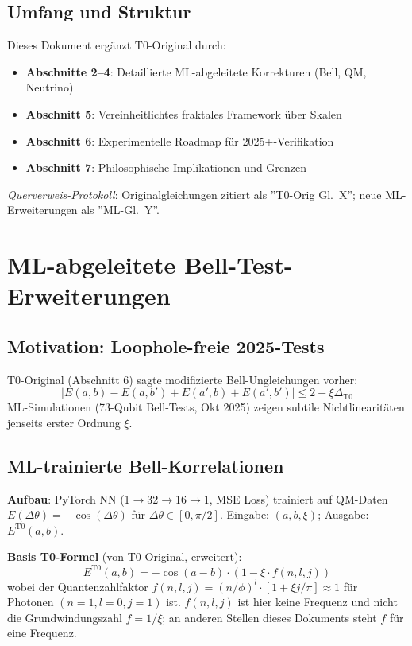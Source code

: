 	\subsection{Umfang und Struktur}
	
	Dieses Dokument ergänzt T0-Original durch:
	\begin{itemize}
		\item \textbf{Abschnitte 2--4}: Detaillierte ML-abgeleitete Korrekturen (Bell, QM, Neutrino)
		\item \textbf{Abschnitt 5}: Vereinheitlichtes fraktales Framework über Skalen
		\item \textbf{Abschnitt 6}: Experimentelle Roadmap für 2025+-Verifikation
		\item \textbf{Abschnitt 7}: Philosophische Implikationen und Grenzen
	\end{itemize}
	
	\textit{Querverweis-Protokoll}: Originalgleichungen zitiert als ''T0-Orig Gl.~X''; neue ML-Erweiterungen als ''ML-Gl.~Y''.
	
	\section{ML-abgeleitete Bell-Test-Erweiterungen}
	
	\subsection{Motivation: Loophole-freie 2025-Tests}
	
	T0-Original (Abschnitt 6) sagte modifizierte Bell-Ungleichungen vorher:
	\begin{equation}
		|E(a,b) - E(a,b') + E(a',b) + E(a',b')| \leq 2 + \xi \Delta_{\text{T0}} \tag{T0-Orig Gl.~6.1}
	\end{equation}
	ML-Simulationen (73-Qubit Bell-Tests, Okt 2025) zeigen subtile Nichtlinearitäten jenseits erster Ordnung $\xi$.
	
	\subsection{ML-trainierte Bell-Korrelationen}
	
	\textbf{Aufbau}: PyTorch NN (1$\to$32$\to$16$\to$1, MSE Loss) trainiert auf QM-Daten $E(\Delta\theta) = -\cos(\Delta\theta)$ für $\Delta\theta \in [0,\pi/2]$. Eingabe: $(a, b, \xi)$; Ausgabe: $E^{\text{T0}}(a,b)$.
	
	\textbf{Basis T0-Formel} (von T0-Original, erweitert):
	\begin{equation}
		E^{\text{T0}}(a,b) = -\cos(a-b) \cdot \left(1 - \xi \cdot f(n,l,j)\right) \tag{ML-Gl.~2.1}
	\end{equation}
	wobei der Quantenzahlfaktor $f(n,l,j) = (n/\phi)^l \cdot [1 + \xi j/\pi] \approx 1$ für Photonen $(n=1, l=0, j=1)$ ist. $f(n,l,j)$ ist hier keine Frequenz und nicht die Grundwindungszahl $f = 1/\xi$; an anderen Stellen dieses Dokuments steht $f$ für eine Frequenz.


